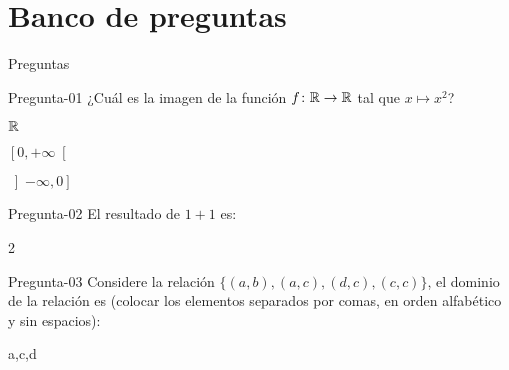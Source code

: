 \documentclass[a4,11pt]{aleph-notas}
\begin{document}
\encabezado

\section{Banco de preguntas}

\begin{quiz}{Preguntas}

\begin{multi}[%
    feedback={La respuesta correcta es $\left[0,+\infty\right[$}
    ]%
    {Pregunta-01}
    ¿Cuál es la imagen de la función $f\colon \mathbb{R} \rightarrow \mathbb{R}$ tal que $x\mapsto x^2$?
    \item $\mathbb{R}$
    \item* $\left[0,+\infty\right[$
    \item $\left]-\infty,0\right]$
\end{multi}

\begin{numerical}[tolerance=0.1,%
    feedback={La suma es igual a $2$.}
    ]%
    {Pregunta-02}
    El resultado de $1+1$ es:
    \item 2
\end{numerical}

\begin{shortanswer}[%
    feedback={El dominio de la relación es $\{a,c,d\}$}
    ]%
    {Pregunta-03}
    Considere la relación $\{(a,b), (a,c), (d,c), (c,c)\}$, el dominio de la relación es (colocar los elementos separados por comas, en orden alfabético y sin espacios):
    \item a,c,d
\end{shortanswer}


\end{quiz}
\end{document}
